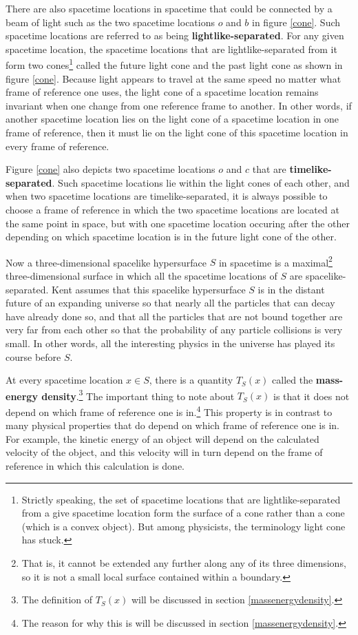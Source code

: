 There are also spacetime locations in spacetime that could be connected by a beam of light such as the two spacetime locations $o$ and $b$ in figure \ref{cone}. Such spacetime locations are referred to as being \textbf{lightlike-separated}. For any given spacetime location, the spacetime locations that are lightlike-separated from it form two cones\footnote{Strictly speaking, the set of spacetime locations that are lightlike-separated from a give spacetime location form the surface of a cone rather than a cone (which is a convex object). But among physicists, the terminology light cone has stuck.} called the future light cone and the past light cone as shown in figure \ref{cone}. Because light appears to travel at the same speed no matter what frame of reference one uses, the light cone of a spacetime location remains invariant when one change from one reference frame to another. In other words, if another spacetime location lies on the light cone of a spacetime location in one frame of reference, then it must lie on the light cone of this spacetime location in every frame of reference. 

Figure \ref{cone} also depicts two spacetime locations $o$ and $c$ that are \textbf{timelike-separated}. Such spacetime locations lie within the light cones of each other, and when two spacetime locations are timelike-separated, it is always possible to choose a frame of reference in which the two spacetime locations are located at the same point in space, but with one spacetime location occuring after the other  depending on which spacetime location is in  the future light cone of the other. 

Now a three-dimensional spacelike hypersurface $S$ in spacetime is a maximal\footnote{That is, it cannot be extended any further along any of its three dimensions, so it is not a small local surface contained within a boundary.} three-dimensional surface in which all the spacetime locations of $S$ are spacelike-separated. Kent assumes that this spacelike hypersurface $S$ is in the distant future of an expanding universe so that nearly all the particles that can decay have already done so, and that all the particles that are not bound together are very far from each other so that the probability of any particle collisions is very small. In other words, all the interesting physics in the universe has played its course before $S$.

At every spacetime location $x\in S$, there is a quantity $T_S(x)$ called the \label{massenergydensity}\textbf{mass-energy density}.\footnote{The definition of $T_S(x)$ will be discussed in section \ref{massenergydensity}.} The important thing to note about $T_S(x)$ is that it does not depend on which frame of reference one is in.\footnote{The reason for why this is will be discussed in section \ref{massenergydensity}.}
  This property is in contrast to many physical properties that do depend on which frame of reference one is in. For example, the kinetic energy of an object will depend on the calculated velocity of the object, and this velocity will in turn depend on the frame of reference in which this calculation is done. 
  
